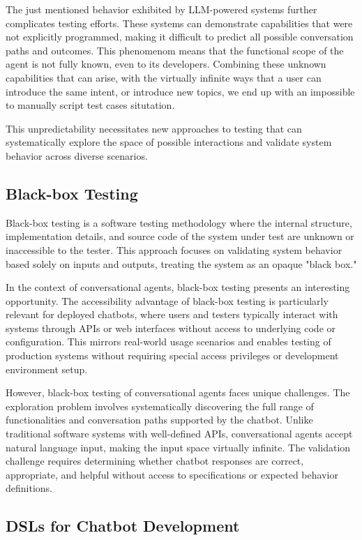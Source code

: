 The just mentioned behavior exhibited by \ac{LLM}-powered systems
further complicates testing efforts.
These systems can demonstrate capabilities that were not explicitly programmed,
making it difficult to predict all possible conversation paths and outcomes.
This phenomenom means that the functional scope of the agent is not fully known,
even to its developers.
Combining these unknown capabilities that can arise,
with the virtually infinite ways that a user can introduce the same intent,
or introduce new topics,
we end up with an impossible to manually script test cases situtation.


This unpredictability necessitates new approaches to testing
that can systematically explore the space of possible interactions
and validate system behavior across diverse scenarios.

\subsection{Black-box Testing}

Black-box testing is a software testing methodology
where the internal structure, implementation details, and source code of the system under test
are unknown or inaccessible to the tester.
This approach focuses on validating system behavior based solely on inputs and outputs,
treating the system as an opaque "black box."

In the context of conversational agents,
black-box testing presents an interesting opportunity.
The accessibility advantage of black-box testing
is particularly relevant for deployed chatbots,
where users and testers typically interact with systems
through \acp{API} or web interfaces without access to underlying code or configuration.
This mirrors real-world usage scenarios
and enables testing of production systems
without requiring special access privileges or development environment setup.


However, black-box testing of conversational agents faces unique challenges.
The exploration problem involves
systematically discovering the full range of functionalities
and conversation paths supported by the chatbot.
Unlike traditional software systems with well-defined \acp{API},
conversational agents accept natural language input,
making the input space virtually infinite.
The validation challenge requires determining
whether chatbot responses are correct, appropriate, and helpful
without access to specifications or expected behavior definitions.

\subsection{\aclp{DSL} for Chatbot Development}

